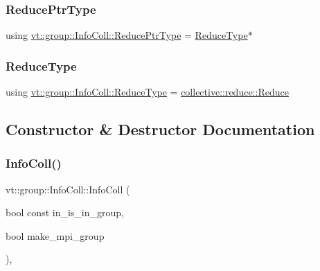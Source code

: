 \mbox{\label{structvt_1_1group_1_1_info_coll_a1b9fe0214f622ed9e8987531f44ef1fa}} 
\subsubsection{\texorpdfstring{Reduce\+Ptr\+Type}{ReducePtrType}}
{\footnotesize\ttfamily using \hyperlink{structvt_1_1group_1_1_info_coll_a1b9fe0214f622ed9e8987531f44ef1fa}{vt\+::group\+::\+Info\+Coll\+::\+Reduce\+Ptr\+Type} =  \hyperlink{structvt_1_1group_1_1_info_coll_a8376e2576e5e40b3c8059122bc96ec1b}{Reduce\+Type}$\ast$}

\mbox{\label{structvt_1_1group_1_1_info_coll_a8376e2576e5e40b3c8059122bc96ec1b}} 
\subsubsection{\texorpdfstring{Reduce\+Type}{ReduceType}}
{\footnotesize\ttfamily using \hyperlink{structvt_1_1group_1_1_info_coll_a8376e2576e5e40b3c8059122bc96ec1b}{vt\+::group\+::\+Info\+Coll\+::\+Reduce\+Type} =  \hyperlink{structvt_1_1collective_1_1reduce_1_1_reduce}{collective\+::reduce\+::\+Reduce}}



\subsection{Constructor \& Destructor Documentation}
\mbox{\label{structvt_1_1group_1_1_info_coll_a289ba2942b64013eabc552e2fe362b0a}} 
\subsubsection{\texorpdfstring{Info\+Coll()}{InfoColl()}}
{\footnotesize\ttfamily vt\+::group\+::\+Info\+Coll\+::\+Info\+Coll (\begin{DoxyParamCaption}\item[{bool const}]{in\+\_\+is\+\_\+in\+\_\+group,  }\item[{bool}]{make\+\_\+mpi\+\_\+group }\end{DoxyParamCaption})\hspace{0.3cm}{\ttfamily [inline]}, {\ttfamily [explicit]}}



